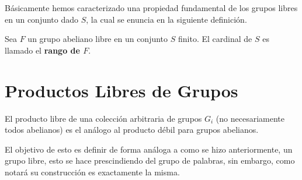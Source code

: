 \documentclass[12pt]{report}
\newcounter{it}
\theoremstyle{largebreak}
\begin{document}
    Básicamente hemos caracterizado una propiedad fundamental de los grupos libres en un conjunto dado $S$, la cual se enuncia en la siguiente definición.

    \begin{mydef}
        Sea $F$ un grupo abeliano libre en un conjunto $S$ finito. El cardinal de $S$ es llamado el \textbf{rango de $F$}.
    \end{mydef}

    \section{Productos Libres de Grupos}

    El producto libre de una colección arbitraria de grupos $G_i$ (no necesariamente todos abelianos) es el análogo al producto débil para grupos abelianos.

    El objetivo de esto es definir de forma análoga a como se hizo anteriormente, un grupo libre, esto se hace prescindiendo del grupo de palabras, sin embargo, como notará su construcción es exactamente la misma.
\end{document}
